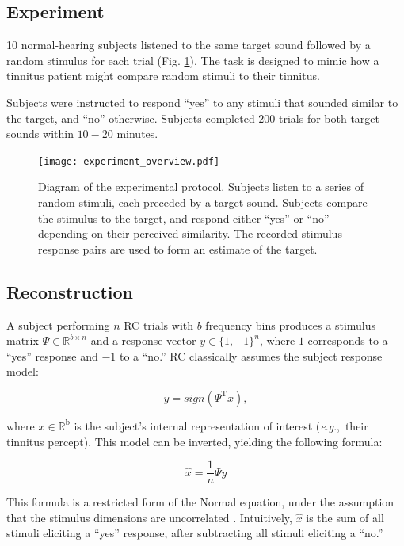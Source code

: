 \documentclass[journal]{IEEEtran}
\newcommand{\eg}{\textit{e}.\textit{g}.,\ }
\begin{document}
\subsection{Experiment}

10 normal-hearing subjects listened to the same target sound followed by a random stimulus for each trial (Fig. \ref{fig:experimentdiagram}).
The task is designed to mimic how a tinnitus patient might compare random stimuli to their tinnitus.

Subjects were instructed to respond ``yes'' to any stimuli that sounded similar to the target, and ``no'' otherwise.
Subjects completed $200$ trials for both target sounds within $10-20$ minutes.

\begin{figure}[t]
  \centering
  \texttt{[image: experiment\_overview.pdf]}
  \caption{Diagram of the experimental protocol.
  Subjects listen to a series of random stimuli,
  each preceded by a target sound.
  Subjects compare the stimulus to the target, and respond either ``yes'' or ``no''
  depending on their perceived similarity.
  The recorded stimulus-response pairs are used to form an estimate of the target.}
  \label{fig:experimentdiagram}
\end{figure}

\subsection{Reconstruction}

A subject performing $n$ RC trials with $b$ frequency bins produces a stimulus matrix $\Psi \in \mathbb{R}^{b \times n}$
and a response vector $y \in \{1,-1\}^n$,
where $1$ corresponds to a ``yes'' response and $-1$ to a ``no.'' RC classically assumes the subject response model:

\begin{equation}
  y = sign(\Psi^\mathrm{T} x), 
\end{equation}

where $x \in \mathbb{R}^\mathrm{b}$ is the subject's internal representation of interest (\eg their tinnitus percept).
This model can be inverted, yielding the following formula:

\begin{equation}
  \hat{x} = \frac{1}{n} \Psi y
  \label{eq:linreg}
\end{equation}

This formula is a restricted form of the Normal equation, under
the assumption that the stimulus dimensions are uncorrelated \cite{gosselinSuperstitiousPerceptionsReveal2003}.
Intuitively, $\hat{x}$ is the sum of all stimuli eliciting a ``yes'' response, after subtracting all stimuli eliciting a ``no.'' 
\end{document}
